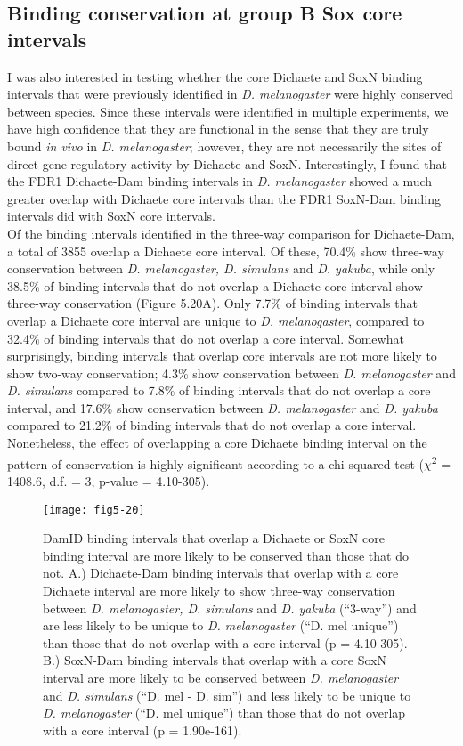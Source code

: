 \subsection{Binding conservation at group B Sox core intervals}
I was also interested in testing whether the core Dichaete and SoxN binding intervals that were previously identified in \emph{D. melanogaster} were highly conserved between species. Since these intervals were identified in multiple experiments, we have high confidence that they are functional in the sense that they are truly bound \emph{in vivo} in \emph{D. melanogaster}; however, they are not necessarily the sites of direct gene regulatory activity by Dichaete and SoxN. Interestingly, I found that the FDR1 Dichaete-Dam binding intervals in \emph{D. melanogaster} showed a much greater overlap with Dichaete core intervals than the FDR1 SoxN-Dam binding intervals did with SoxN core intervals.\\

Of the binding intervals identified in the three-way comparison for Dichaete-Dam, a total of 3855 overlap a Dichaete core interval. Of these, 70.4\% show three-way conservation between \emph{D. melanogaster, D. simulans} and \emph{D. yakuba}, while only 38.5\% of binding intervals that do not overlap a Dichaete core interval show three-way conservation (Figure 5.20A). Only 7.7\% of binding intervals that overlap a Dichaete core interval are unique to \emph{D. melanogaster}, compared to 32.4\% of binding intervals that do not overlap a core interval. Somewhat surprisingly, binding intervals that overlap core intervals are not more likely to show two-way conservation; 4.3\% show conservation between \emph{D. melanogaster} and \emph{D. simulans} compared to 7.8\% of binding intervals that do not overlap a core interval, and 17.6\% show conservation between \emph{D. melanogaster} and \emph{D. yakuba} compared to 21.2\% of binding intervals that do not overlap a core interval. Nonetheless, the effect of overlapping a core Dichaete binding interval on the pattern of conservation is highly significant according to a chi-squared test (\(\chi\)\textsuperscript{2} = 1408.6, d.f. = 3, p-value = 4.10-305).\\

\begin{figure}
\centering
\texttt{[image: fig5-20]}
\caption{DamID binding intervals that overlap a Dichaete or SoxN core binding interval are more likely to be conserved than those that do not. A.) Dichaete-Dam binding intervals that overlap with a core Dichaete interval are more likely to show three-way conservation between \emph{D. melanogaster, D. simulans} and \emph{D. yakuba} (“3-way”) and are less likely to be unique to \emph{D. melanogaster}  (“D. mel unique”) than those that do not overlap with a core interval (p = 4.10-305). B.) SoxN-Dam binding intervals that overlap with a core SoxN interval are more likely to be conserved between \emph{D. melanogaster} and \emph{D. simulans} (“D. mel - D. sim”) and less likely to be unique to \emph{D. melanogaster} (“D. mel unique”) than those that do not overlap with a core interval (p = 1.90e-161).}
\label{Figure 5.20}
\end{figure}

